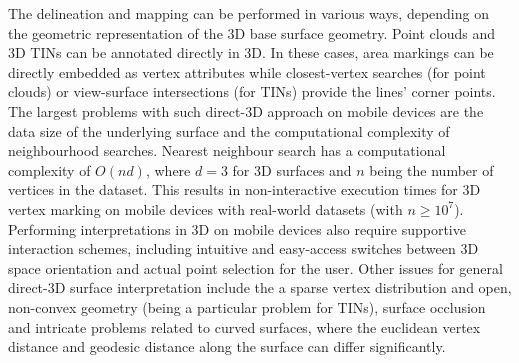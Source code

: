 \documentclass[review]{elsarticle}
\begin{document}
The delineation and mapping can be performed in various ways, depending on the geometric representation of the 3D base surface geometry. Point clouds and 3D \glspl{TIN} can be annotated directly in 3D. In these cases, area markings can be directly embedded as vertex attributes while closest-vertex searches (for point clouds) or view-surface intersections (for \glspl{TIN}) provide the lines' corner points. The largest problems with such direct-3D approach on mobile devices are the data size of the underlying surface and the computational complexity of neighbourhood searches. Nearest neighbour search has a computational complexity of $O(nd)$, where $d=3$ for 3D surfaces and $n$ being the number of vertices in the dataset. This results in non-interactive execution times for 3D vertex marking on mobile devices with real-world datasets (with $n \geq 10^7$). Performing interpretations in 3D on mobile devices also require supportive interaction schemes, including intuitive and easy-access switches between 3D space orientation and actual point selection for the user. Other issues for general direct-3D surface interpretation include the a sparse vertex distribution and open, non-convex geometry (being a particular problem for \glspl{TIN}), surface occlusion and intricate problems related to curved surfaces, where the euclidean vertex distance and geodesic distance along the surface can differ significantly. 

\end{document}

